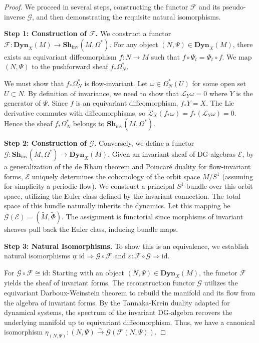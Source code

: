 \begin{proof}
We proceed in several steps, constructing the functor $\mathcal{F}$ and its pseudo-inverse $\mathcal{G}$, and then demonstrating the requisite natural isomorphisms.

\textbf{Step 1: Construction of $\mathcal{F}$.}
We construct a functor $\mathcal{F}: \mathbf{Dyn}_X(M) \to \mathbf{Sh}_{\text{inv}}(M, \Omega^*)$. For any object $(N, \Psi) \in \mathbf{Dyn}_X(M)$, there exists an equivariant diffeomorphism $f: N \to M$ such that $f \circ \Psi_t = \Phi_t \circ f$. We map $(N, \Psi)$ to the pushforward sheaf $f_* \Omega_N^*$.

We must show that $f_* \Omega_N^*$ is flow-invariant. Let $\omega \in \Omega_N^*(U)$ for some open set $U \subset N$. By definition of invariance, we need to show that $\mathcal{L}_Y \omega = 0$ where $Y$ is the generator of $\Psi$. Since $f$ is an equivariant diffeomorphism, $f_* Y = X$. The Lie derivative commutes with diffeomorphisms, so $\mathcal{L}_X (f_* \omega) = f_* (\mathcal{L}_Y \omega) = 0$. Hence the sheaf $f_* \Omega_N^*$ belongs to $\mathbf{Sh}_{\text{inv}}(M, \Omega^*)$.

\textbf{Step 2: Construction of $\mathcal{G}$.}
Conversely, we define a functor $\mathcal{G}: \mathbf{Sh}_{\text{inv}}(M, \Omega^*) \to \mathbf{Dyn}_X(M)$. Given an invariant sheaf of DG-algebras $\mathcal{E}$, by a generalization of the de Rham theorem and Poincaré duality for flow-invariant forms, $\mathcal{E}$ uniquely determines the cohomology of the orbit space $M/S^1$ (assuming for simplicity a periodic flow). We construct a principal $S^1$-bundle over this orbit space, utilizing the Euler class defined by the invariant connection. The total space of this bundle naturally inherits the dynamics. Let this mapping be $\mathcal{G}(\mathcal{E}) = (\tilde{M}, \tilde{\Phi})$. The assignment is functorial since morphisms of invariant sheaves pull back the Euler class, inducing bundle maps.

\textbf{Step 3: Natural Isomorphisms.}
To show this is an equivalence, we establish natural isomorphisms $\eta: \text{id} \Rightarrow \mathcal{G} \circ \mathcal{F}$ and $\varepsilon: \mathcal{F} \circ \mathcal{G} \Rightarrow \text{id}$.

For $\mathcal{G} \circ \mathcal{F} \cong \text{id}$: Starting with an object $(N, \Psi) \in \mathbf{Dyn}_X(M)$, the functor $\mathcal{F}$ yields the sheaf of invariant forms. The reconstruction functor $\mathcal{G}$ utilizes the equivariant Darboux-Weinstein theorem to rebuild the manifold and its flow from the algebra of invariant forms. By the Tannaka-Krein duality adapted for dynamical systems, the spectrum of the invariant DG-algebra recovers the underlying manifold up to equivariant diffeomorphism. Thus, we have a canonical isomorphism $\eta_{(N, \Psi)}: (N, \Psi) \xrightarrow{\sim} \mathcal{G}(\mathcal{F}(N, \Psi))$.


\end{proof}
